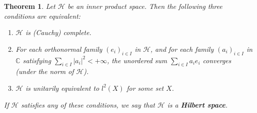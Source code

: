 \documentclass[12pt,b5paper,notitlepage]{article}
\theoremstyle{definition}
\theoremstyle{plain}
\newtheorem{thm}[df]{Theorem}
\newcommand{\Cbb}{\mathbb C}
\newcommand{\MH}{\mathcal H}
\numberwithin{equation}{section}
\begin{document}
\begin{thm}\label{lb129}
Let $\MH$ be an inner product space. Then the following three conditions are equivalent:
\begin{enumerate}[label=(\alph*)]
\item $\MH$ is (Cauchy) complete.
\item For each orthonormal family $(e_i)_{i\in I}$ in $\MH$, and for each family $(a_i)_{i\in I}$ in $\Cbb$ satisfying $\sum_{i\in I}|a_i|^2<+\infty$, the unordered sum $\sum_{i\in I}a_ie_i$ converges (under the norm of $\MH$).
\item $\MH$ is unitarily equivalent to $l^2(X)$ for some set $X$.
\end{enumerate} 
If $\MH$ satisfies any of these conditions, we say that $\MH$ is a \textbf{Hilbert space}.
\end{thm}
\end{document}

